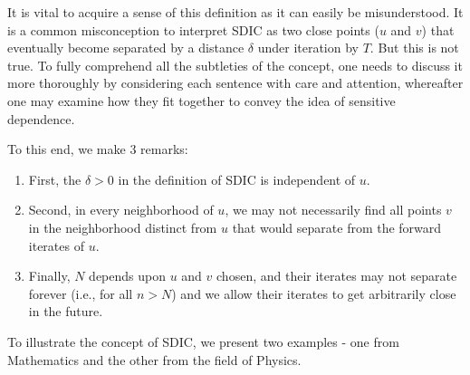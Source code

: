 It is vital to acquire a sense of this definition as it can easily be misunderstood. It is a common misconception to interpret SDIC as two close points ($u$ and $v$) that eventually become separated by a distance $\delta$ under iteration by $T$. But this is not true. To fully comprehend all the subtleties of the concept, one needs to discuss it more thoroughly by considering each sentence with care and attention, whereafter one may examine how they fit together to convey the idea of sensitive dependence. 

To this end, we make 3 remarks:
\vspace{-5mm}
\begin{enumerate}
  \item First, the $\delta>0$ in the definition of SDIC is independent of $u$. 
  \item Second, in every neighborhood of $u$, we may not necessarily find all points $v$ in the neighborhood distinct from $u$ that would separate from the forward iterates of $u$. 
  \item  Finally, $N$ depends upon $u$ and $v$ chosen, and their iterates may not separate forever (i.e., for all $n>N$) and we allow their iterates to get arbitrarily close in the future. 
\end{enumerate}

To illustrate the concept of SDIC, we present two examples - one from Mathematics and the other from the field of Physics.

